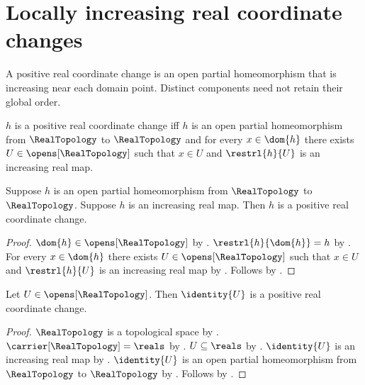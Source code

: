 \section{Locally increasing real coordinate changes}



A positive real coordinate change is an open partial homeomorphism that is
increasing near each domain point. Distinct components need not retain their
global order.

\begin{definition}\label{positive_real_change}
    $h$ is a positive real coordinate change iff
        $h$ is an open partial homeomorphism from $\RealTopology$ to $\RealTopology$ and
        for every $x\in\dom{h}$ there exists $U\in\opens[\RealTopology]$ such that
            $x\in U$ and $\restrl{h}{U}$ is an increasing real map.
\end{definition}

\begin{theorem}\label{increasing_real_homeomorphism_is_positive}
    Suppose $h$ is an open partial homeomorphism from $\RealTopology$ to $\RealTopology$.
    Suppose $h$ is an increasing real map.
    Then $h$ is a positive real coordinate change.
\end{theorem}
\begin{proof}
    $\dom{h}\in\opens[\RealTopology]$ by .
    $\restrl{h}{\dom{h}}=h$ by .
    For every $x\in\dom{h}$ there exists $U\in\opens[\RealTopology]$ such that
        $x\in U$ and $\restrl{h}{U}$ is an increasing real map by \auto.
    Follows by .
\end{proof}

\begin{theorem}\label{open_identity_positive_real_change}
    Let $U\in\opens[\RealTopology]$.
    Then $\identity{U}$ is a positive real coordinate change.
\end{theorem}
\begin{proof}
    $\RealTopology$ is a topological space by .
    $\carrier[\RealTopology]=\reals$ by .
    $U\subseteq\reals$ by .
    $\identity{U}$ is an increasing real map by .
    $\identity{U}$ is an open partial homeomorphism from $\RealTopology$ to $\RealTopology$
        by .
    Follows by .
\end{proof}


